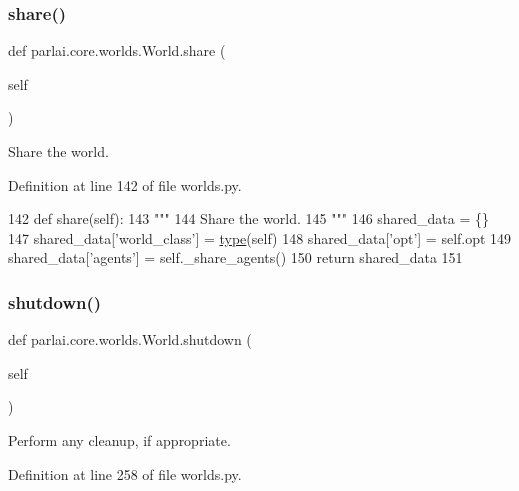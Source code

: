 \subsubsection{\texorpdfstring{share()}{share()}}
{\footnotesize\ttfamily def parlai.\+core.\+worlds.\+World.\+share (\begin{DoxyParamCaption}\item[{}]{self }\end{DoxyParamCaption})}

\begin{DoxyVerb}Share the world.
\end{DoxyVerb}
 

Definition at line 142 of file worlds.\+py.


\begin{DoxyCode}
142     \textcolor{keyword}{def }share(self):
143         \textcolor{stringliteral}{"""}
144 \textcolor{stringliteral}{        Share the world.}
145 \textcolor{stringliteral}{        """}
146         shared\_data = \{\}
147         shared\_data[\textcolor{stringliteral}{'world\_class'}] = \hyperlink{namespaceparlai_1_1agents_1_1tfidf__retriever_1_1build__tfidf_ad5dfae268e23f506da084a9efb72f619}{type}(self)
148         shared\_data[\textcolor{stringliteral}{'opt'}] = self.opt
149         shared\_data[\textcolor{stringliteral}{'agents'}] = self.\_share\_agents()
150         \textcolor{keywordflow}{return} shared\_data
151 
\end{DoxyCode}
\mbox{\label{classparlai_1_1core_1_1worlds_1_1World_a7e7e5a27569323dd334b87df6fef31e6}} 
\subsubsection{\texorpdfstring{shutdown()}{shutdown()}}
{\footnotesize\ttfamily def parlai.\+core.\+worlds.\+World.\+shutdown (\begin{DoxyParamCaption}\item[{}]{self }\end{DoxyParamCaption})}

\begin{DoxyVerb}Perform any cleanup, if appropriate.
\end{DoxyVerb}
 

Definition at line 258 of file worlds.\+py.



